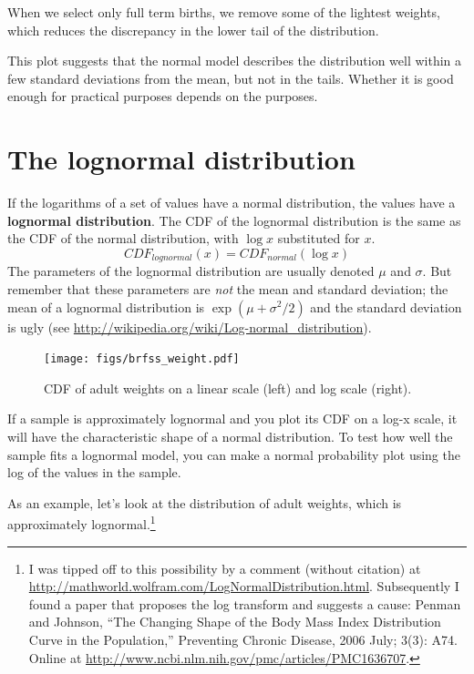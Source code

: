 \documentclass[12pt]{book}
\theoremstyle{exercise}
\begin{document}
When we select only full term births, we remove some of the lightest
weights, which reduces the discrepancy in the lower tail of the
distribution.

This plot suggests that the normal model describes the distribution
well within a few standard deviations from the mean, but not in the
tails.  Whether it is good enough for practical purposes depends
on the purposes.%
%
%
%


\section{The lognormal distribution}%
\label{brfss}%
\label{lognormal}

If the logarithms of a set of values have a normal distribution, the
values have a {\bf lognormal distribution}.  The CDF of the lognormal
distribution is the same as the CDF of the normal distribution,
with $\log x$ substituted for $x$.
%
\[ CDF_{lognormal}(x) = CDF_{normal}(\log x)\]
%
The parameters of the lognormal distribution are usually denoted
$\mu$ and $\sigma$.  But remember that these parameters are {\em not\/}
the mean and standard deviation; the mean of a lognormal distribution
is $\exp(\mu +\sigma^2/2)$ and the standard deviation is
ugly (see \url{http://wikipedia.org/wiki/Log-normal_distribution}).%
%
%
%
%
%

\begin{figure}
\centerline{
\texttt{[image: figs/brfss\_weight.pdf]}}
\caption{CDF of adult weights on a linear scale (left) and
log scale (right).}%
\label{brfss_weight}
\end{figure}

If a sample is approximately lognormal and you plot its CDF on a
log-x scale, it will have the characteristic shape of a normal
distribution.  To test how well the sample fits a lognormal model, you
can make a normal probability plot using the log of the values
in the sample.%
%

As an example, let's look at the distribution of adult weights, which
is approximately lognormal.\footnote{I was tipped off to this
  possibility by a comment (without citation) at
  \url{http://mathworld.wolfram.com/LogNormalDistribution.html}.
  Subsequently I found a paper that proposes the log transform and
  suggests a cause: Penman and Johnson, ``The Changing Shape of the
  Body Mass Index Distribution Curve in the Population,'' Preventing
  Chronic Disease, 2006 July; 3(3): A74.  Online at
  \url{http://www.ncbi.nlm.nih.gov/pmc/articles/PMC1636707}.}
\end{document}

